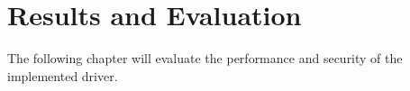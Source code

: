 \section{Results and Evaluation}
\label{sec:evaluation}
The following chapter will evaluate the performance and security of the implemented driver.

